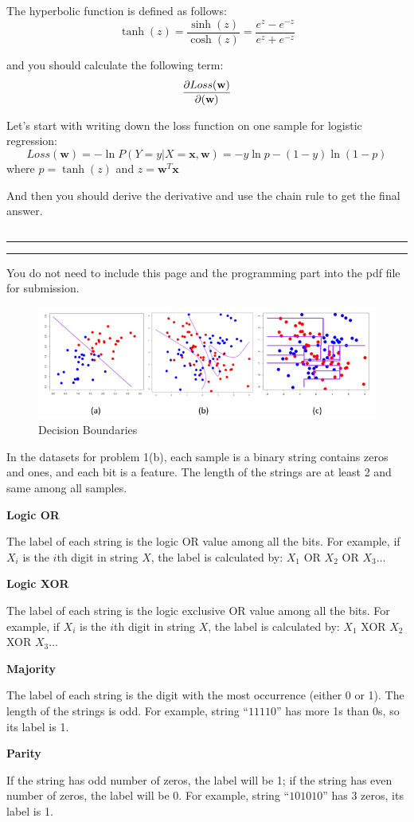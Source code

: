 \documentclass[11pt]{article}
\newcounter{marks}
\def\maxmarks#1{\extramark{#1}\addtocounter{marks}{#1}}
\def\extramark#1{
  \begin{flushright}
  [\emph{#1 points}]
  \end{flushright}
}
\def\dumptotal{%
\begin{flushright}
\begin{tabular}{|l|} \hline
\LARGE{\textbf{\rule{0pt}{16pt}Total:~\themarks}} \\ \hline
\end{tabular}
\end{flushright}}
\newcommand{\question}[2] {\vspace{.25in} \hrule\vspace{0.5em} \noindent{\bf #1: #2} \vspace{0.5em} \hrule \vspace{.10in}}
\begin{document}
The hyperbolic function is defined as follows:
\begin{equation}
\tanh(z)=\frac{\sinh(z)}{\cosh(z)}=\frac{e^z-e^{-z}}{e^z+e^{-z}}
\end{equation}

and you should calculate the following term:
\begin{equation}
\frac{\partial Loss(\textbf w)}{\partial (\textbf w)}
\end{equation}


Let's start with writing down the loss function on one sample for logistic regression:
\begin{equation}
Loss(\textbf{w})=-\ln P(Y=y|X=\textbf{x},\textbf{w})=-y\ln p-(1-y)\ln(1-p)
\end{equation}
where $p = \tanh(z)$ and $z = \textbf{w}^T\textbf{x}$

And then you should derive the derivative and use the chain rule to get the final answer.
\maxmarks{20} \vspace*{0 cm}

\dumptotal

\newpage
\question{3}{Appendix}
You do not need to include this page and the programming part into the pdf file for submission.

\begin{figure}[h]
    \centering
    \includegraphics[scale=0.7]{figures/classifier.png}
    \caption{Decision Boundaries}
    \label{db}
\end{figure}

In the datasets for problem 1(b), each sample is a binary string contains zeros and ones, and each bit is a feature. The length of the strings are at least 2 and same among all samples.

\textbf{Logic OR}

The label of each string is the logic OR value among all the bits. For example, if $X_i$ is the $i$th digit in string $X$, the label is calculated by: $X_1$ OR $X_2$ OR $X_3 \hdots$

\textbf{Logic XOR}

The label of each string is the logic exclusive OR value among all the bits. For example, if $X_i$ is the $i$th digit in string $X$, the label is calculated by: $X_1$ XOR $X_2$ XOR $X_3 \hdots$

\textbf{Majority}

The label of each string is the digit with the most occurrence (either 0 or 1). The length of the strings is odd. For example, string ``$11110$'' has more 1s than 0s, so its label is 1.

\textbf{Parity}

If the string has odd number of zeros, the label will be 1; if the string has even number of zeros, the label will be 0. For example, string ``$101010$'' has 3 zeros, its label is 1.
\end{document}
